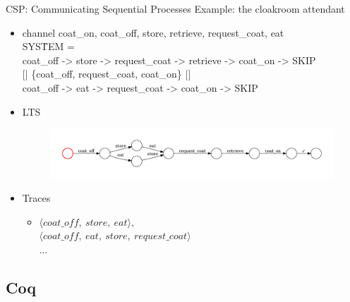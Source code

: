 \documentclass[t]{beamer}
\begin{document}
\begin{frame}{CSP: Communicating Sequential Processes}
	Example: the cloakroom attendant\\[2ex]
	\begin{itemize}
		\item \CSPM{}
		\ttfamily
		\scriptsize
		\begin{tabbing}
			channel coat\_on, coat\_off, store, retrieve, request\_coat, eat\\
			SYS\=TEM =\\
			\>	coat\_off -> store -> request\_coat -> retrieve -> coat\_on -> SKIP\\
			\>	{[| \{coat\_off, request\_coat, coat\_on\} |]}\\
			\>	coat\_off -> eat -> request\_coat -> coat\_on -> SKIP
		\end{tabbing}
		\normalfont
		\normalsize
		
		\vskip 0.1in
		\item LTS
		\begin{figure}
			\includegraphics[scale=0.3]{figures/LTS.pdf}
		\end{figure}

		\item Traces
		\begin{itemize}
			\item $ \langle \mathit{coat\_off,\ store,\ eat} \rangle, $ \\
			$ \langle \mathit{coat\_off,\ eat,\ store,\ request\_coat} \rangle $\\
			$\ldots$
		\end{itemize}
	\end{itemize}
\end{frame}

\subsection{Coq}
\end{document}
